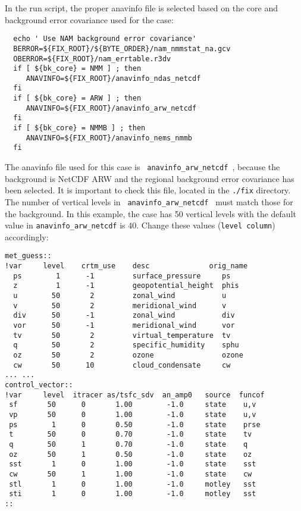 In the run script, the proper anavinfo file is selected based on the core and background error covariance used for the case:

\begin{footnotesize}
\begin{verbatim}
  echo ' Use NAM background error covariance'
  BERROR=${FIX_ROOT}/${BYTE_ORDER}/nam_nmmstat_na.gcv
  OBERROR=${FIX_ROOT}/nam_errtable.r3dv
  if [ ${bk_core} = NMM ] ; then
     ANAVINFO=${FIX_ROOT}/anavinfo_ndas_netcdf
  fi
  if [ ${bk_core} = ARW ] ; then
     ANAVINFO=${FIX_ROOT}/anavinfo_arw_netcdf
  fi
  if [ ${bk_core} = NMMB ] ; then
     ANAVINFO=${FIX_ROOT}/anavinfo_nems_nmmb
  fi
\end{verbatim}
\end{footnotesize}

The anavinfo file used for this case is \verb| anavinfo_arw_netcdf |, because the background is NetCDF ARW and the regional background error covariance has been selected. It is
important to check this file, located in the \verb|./fix| directory. The number of vertical levels in  \verb| anavinfo_arw_netcdf | must match those for the background. In this example, the case has 50 vertical levels with the default value in \verb|anavinfo_arw_netcdf| is 40. Change these values (\verb|level column|) accordingly:

\begin{footnotesize}
\begin{verbatim}
met_guess::
!var     level    crtm_use    desc              orig_name
  ps        1      -1         surface_pressure     ps
  z         1      -1         geopotential_height  phis
  u        50       2         zonal_wind           u
  v        50       2         meridional_wind      v
  div      50      -1         zonal_wind           div
  vor      50      -1         meridional_wind      vor
  tv       50       2         virtual_temperature  tv
  q        50       2         specific_humidity    sphu
  oz       50       2         ozone                ozone
  cw       50      10         cloud_condensate     cw
... ...
control_vector::
!var     level  itracer as/tsfc_sdv  an_amp0   source  funcof
 sf       50      0       1.00        -1.0     state    u,v
 vp       50      0       1.00        -1.0     state    u,v
 ps        1      0       0.50        -1.0     state    prse
 t        50      0       0.70        -1.0     state    tv
 q        50      1       0.70        -1.0     state    q
 oz       50      1       0.50        -1.0     state    oz
 sst       1      0       1.00        -1.0     state    sst
 cw       50      1       1.00        -1.0     state    cw
 stl       1      0       1.00        -1.0     motley   sst
 sti       1      0       1.00        -1.0     motley   sst
::
\end{verbatim}
\end{footnotesize}

